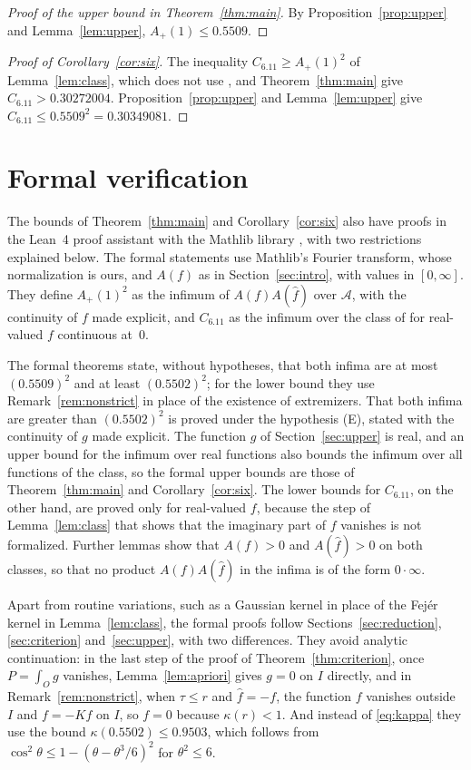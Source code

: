 \documentclass[11pt]{amsart}
\theoremstyle{definition}
\theoremstyle{remark}
\numberwithin{equation}{section}
\newcommand{\cA}{\mathcal{A}}
\newcommand{\ft}[1]{\widehat{#1}}
\newcommand{\Ap}{A_+(1)}
\newcommand{\Csix}{C_{6.11}}
\newcommand{\rdec}{0.5502}
\newcommand{\Cdec}{0.30272004}
\newcommand{\rPdec}{0.5509}
\newcommand{\CPdec}{0.30349081}
\newcommand{\lowKappa}{0.9503}
\begin{document}
\begin{proof}[Proof of the upper bound in Theorem~\ref{thm:main}]
By Proposition~\ref{prop:upper} and Lemma~\ref{lem:upper}, $\Ap\le\rPdec$.
\end{proof}

\begin{proof}[Proof of Corollary~\ref{cor:six}]
The inequality $\Csix\ge\Ap^2$ of Lemma~\ref{lem:class}, which does not use \cite{GOR21}, and Theorem~\ref{thm:main} give $\Csix>\Cdec$. Proposition~\ref{prop:upper} and Lemma~\ref{lem:upper} give $\Csix\le\rPdec^2=\CPdec$.
\end{proof}

\section{Formal verification}\label{sec:lean}

The bounds of Theorem~\ref{thm:main} and Corollary~\ref{cor:six} also have proofs in the Lean~4 proof assistant \cite{Lean4} with the Mathlib library \cite{Mathlib}, with two restrictions explained below. The formal statements use Mathlib's Fourier transform, whose normalization is ours, and $A(f)$ as in Section~\ref{sec:intro}, with values in $[0,\infty]$. They define $\Ap^2$ as the infimum of $A(f)A(\ft f)$ over $\cA$, with the continuity of $f$ made explicit, and $\Csix$ as the infimum over the class of \cite[Problem~6.11]{GGTW25} for real-valued $f$ continuous at~$0$.

The formal theorems state, without hypotheses, that both infima are at most $(\rPdec)^2$ and at least $(\rdec)^2$; for the lower bound they use Remark~\ref{rem:nonstrict} in place of the existence of extremizers. That both infima are greater than $(\rdec)^2$ is proved under the hypothesis \textup{(E)}, stated with the continuity of $g$ made explicit. The function $g$ of Section~\ref{sec:upper} is real, and an upper bound for the infimum over real functions also bounds the infimum over all functions of the class, so the formal upper bounds are those of Theorem~\ref{thm:main} and Corollary~\ref{cor:six}. The lower bounds for $\Csix$, on the other hand, are proved only for real-valued $f$, because the step of Lemma~\ref{lem:class} that shows that the imaginary part of $f$ vanishes is not formalized. Further lemmas show that $A(f)>0$ and $A(\ft f)>0$ on both classes, so that no product $A(f)A(\ft f)$ in the infima is of the form $0\cdot\infty$.

Apart from routine variations, such as a Gaussian kernel in place of the Fej\'er kernel in Lemma~\ref{lem:class}, the formal proofs follow Sections~\ref{sec:reduction}, \ref{sec:criterion} and~\ref{sec:upper}, with two differences. They avoid analytic continuation: in the last step of the proof of Theorem~\ref{thm:criterion}, once $P=\int_Og$ vanishes, Lemma~\ref{lem:apriori} gives $g=0$ on $I$ directly, and in Remark~\ref{rem:nonstrict}, when $\tau\le r$ and $\ft f=-f$, the function $f$ vanishes outside $I$ and $f=-Kf$ on $I$, so $f=0$ because $\kappa(r)<1$. And instead of \eqref{eq:kappa} they use the bound $\kappa(\rdec)\le\lowKappa$, which follows from $\cos^2\theta\le1-(\theta-\theta^3/6)^2$ for $\theta^2\le6$.
\end{document}
